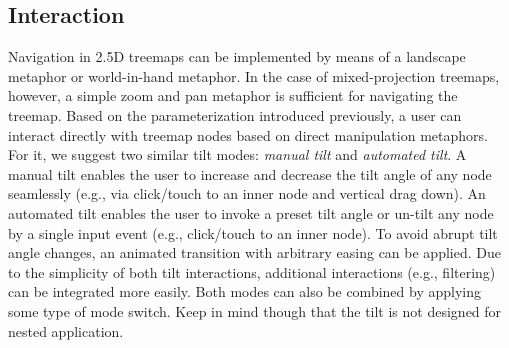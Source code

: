 \subsection*{Interaction}
\noindent
Navigation in 2.5D treemaps can be implemented by means of a landscape metaphor or world-in-hand metaphor.
In the case of mixed-projection treemaps, however, a simple zoom and pan metaphor is sufficient for navigating the treemap.
Based on the parameterization introduced previously, a user can interact directly with treemap nodes based on direct manipulation metaphors.
For it, we suggest two similar tilt modes: \emph{manual tilt} and
\emph{automated tilt}.
A manual tilt enables the user to increase and decrease the tilt angle of any node seamlessly (e.g., via click/touch to an inner node and vertical drag down).
An automated tilt enables the user to invoke a preset tilt angle or un-tilt any node by a single input event (e.g., click/touch to an inner node).
To avoid abrupt tilt angle changes, an animated transition with arbitrary easing can be applied.
Due to the simplicity of both tilt interactions, additional interactions (e.g., filtering) can be integrated more easily.
Both modes can also be combined by applying some type of mode switch.
Keep in mind though that the tilt is not designed for nested application.
